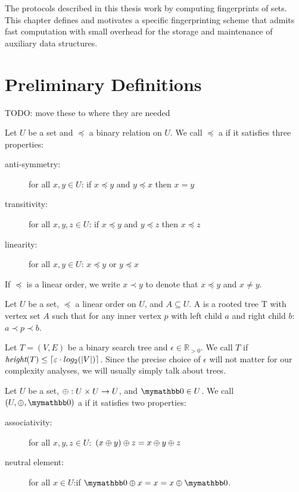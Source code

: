 
The protocols described in this thesis work by computing fingerprints of sets.
This chapter defines and motivates a specific fingerprinting scheme that admits fast computation with small overhead for the storage and maintenance of auxiliary data structures.

\section{Preliminary Definitions}

TODO: move these to where they are needed

\begin{definition}
Let $U$ be a set and $\preceq$ a binary relation on $U$.
We call $\preceq$ a  if it satisfies three properties:

  \begin{description}
    \item[anti-symmetry:] for all $x, y \in U$: if $x \preceq y$ and $y \preceq x$ then $x = y$
    \item[transitivity:] for all $x, y, z \in U$: if $x \preceq y$ and $y \preceq z$ then $x \preceq z$
    \item[linearity:] for all $x, y \in U$: $x \preceq y$ or $y \preceq x$
  \end{description}

If $\preceq$ is a linear order, we write $x \prec y$ to denote that $x \preceq y$ and $x \neq y$.
\end{definition}

\begin{definition}
Let $U$ be a set, $\preceq$ a linear order on $U$, and $A \subseteq U$.
A  is a rooted tree T with vertex set $A$ such that for any inner vertex $p$ with left child $a$ and right child $b$: $a \prec p \prec b$.
\end{definition}

\begin{definition}
Let $T = (V, E)$ be a binary search tree and $\epsilon \in \mathbb{R}_{> 0}$.
We call $T$  if $\textit{height}(T) \leq \ceil*{\epsilon \cdot log_2(|V|)}$.
Since the precise choice of $\epsilon$ will not matter for our complexity analyses, we will usually simply talk about  trees.
\end{definition}

\begin{definition}
Let $U$ be a set, $\groupaddsym: U \times U \rightarrow U$, and $\neutraladd \in U$.
We call $(U, \groupaddsym, \neutraladd)$ a  if it satisfies two properties:

  \begin{description}
    \item[associativity:] for all $x, y, z \in U:$ $\groupadd{(\groupadd{x}{y})}{z} = \groupadd{x}{\groupadd{y}{z}}$
    \item[neutral element:] for all $x \in U$:if $\groupadd{\neutraladd}{x} = x = \groupadd{x}{\neutraladd}$.
  \end{description}
\end{definition}

